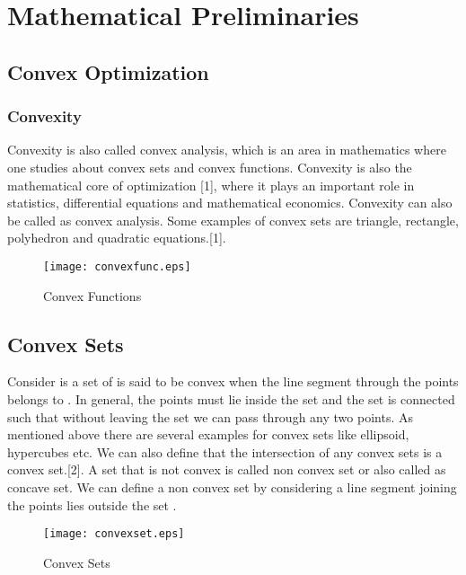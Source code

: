 

\section{Mathematical Preliminaries}
\subsection{Convex Optimization}

\subsubsection{Convexity}
Convexity is also called convex analysis, which is an area in mathematics where one studies about convex sets and convex functions. Convexity is also the mathematical core of optimization [1], where it plays an important role in statistics, differential equations and mathematical economics. Convexity can also be called as convex analysis. Some examples of convex sets are triangle, rectangle, polyhedron and quadratic equations.[1]. 
\begin{figure}[h]
	\begin{center}
		\texttt{[image: convexfunc.eps]}
		\caption{Convex Functions}
	\end{center}
\end{figure}
\subsection{Convex Sets}
Consider  is a set of  is said to be convex when the line segment through the points  belongs to . In general, the points must lie inside the set and the set is connected such that without leaving the set we can pass through any two points. As mentioned above there are several examples for convex sets like ellipsoid, hypercubes etc. We can also define that the intersection of any convex sets is a convex set.[2]. 
A set that is not convex is called non convex set or also called as concave set. We can define a non convex set by considering a line segment joining the points  lies outside the set .
\begin{figure}[h]
	\begin{center}
		\texttt{[image: convexset.eps]}
		\caption{Convex Sets}
	\end{center}
\end{figure}

